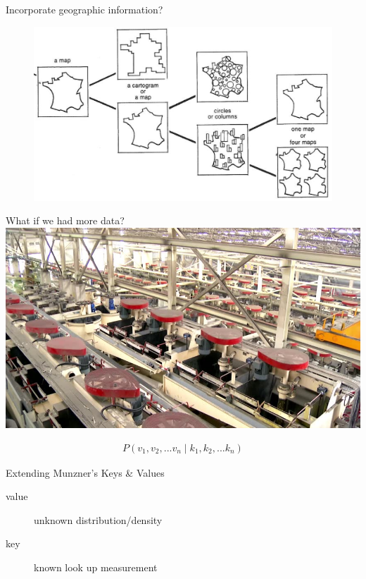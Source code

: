 \documentclass[xcolor={dvipsnames}]{beamer}
\begin{document}
\begin{frame}{Incorporate geographic information?}
\begin{figure}
\includegraphics[width=\textwidth]{figs/chart_chooser_bottom.png}
\end{figure}
\end{frame}

\begin{frame}{What if we had more data?}
\includegraphics[width=\textwidth]{figs/growingeconomy.jpg}
\end{frame}

\begin{frame}
{\huge
\begin{align*}
P(v_1, v_2,...v_n \mid k_1, k_2,...k_n)
\end{align*}
}
\begin{block}{Extending Munzner's Keys \& Values \cite{munzner_what:_2014}}
    \begin{description}
        \item[value] unknown distribution/density
        \item[key] known look up measurement 
    \end{description}
\end{block}
\end{frame}
\end{document}
